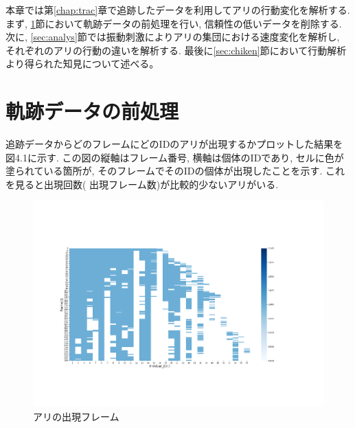 ﻿\documentclass[a4paper, 12pt]{jsreport}
\begin{document}
本章では第\ref{chap:trac}章で追跡したデータを利用してアリの行動変化を解析する. まず, \ref{sec:process}節において軌跡データの前処理を行い, 信頼性の低いデータを削除する. 次に, \ref{sec:analys}節では振動刺激によりアリの集団における速度変化を解析し, それぞれのアリの行動の違いを解析する. 最後に\ref{sec:chiken}節において行動解析より得られた知見について述べる。
\section{軌跡データの前処理}
\label{sec:process}
追跡データからどのフレームにどのIDのアリが出現するかプロットした結果を図4.1に示す. この図の縦軸はフレーム番号, 横軸は個体のIDであり, セルに色が塗られている箇所が, そのフレームでそのIDの個体が出現したことを示す. これを見ると出現回数( 出現フレーム数)が比較的少ないアリがいる. 

\begin{figure}[tbp]
\centering
\includegraphics[width=13cm,  keepaspectratio]{existence.pdf}
\caption[Short figure caption for List of Figures]{アリの出現フレーム }
\label{fig:paper1_fig8}
\end{figure}
\end{document}
